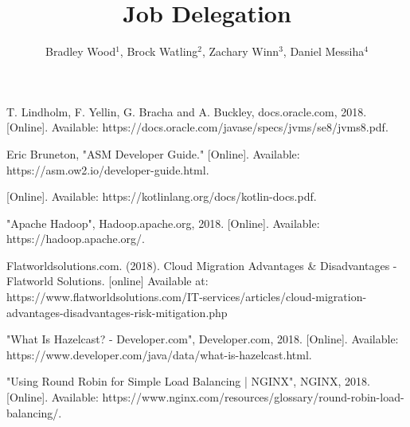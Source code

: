 \documentclass[letterpaper, 11 pt, conference]{ieeeconf}
\title{Job Delegation}
\author{Bradley Wood$^{1}$, Brock Watling$^{2}$, Zachary Winn$^{3}$, Daniel Messiha$^{4}$}
\begin{document}
    \maketitle
    \thispagestyle{empty}
    \pagestyle{empty}

    

    

    

    

    

    

    

    

    

    

    \addtolength{\textheight}{-12cm}


    \begin{thebibliography}{99}

        T. Lindholm, F. Yellin, G. Bracha and A. Buckley, docs.oracle.com, 2018. [Online].
        Available: https://docs.oracle.com/javase/specs/jvms/se8/jvms8.pdf.

        Eric Bruneton, "ASM Developer Guide." [Online].
        Available: https://asm.ow2.io/developer-guide.html.

        [Online].
        Available: https://kotlinlang.org/docs/kotlin-docs.pdf.

        "Apache Hadoop", Hadoop.apache.org, 2018. [Online].
        Available: https://hadoop.apache.org/.

        Flatworldsolutions.com. (2018).
        Cloud Migration Advantages & Disadvantages - Flatworld Solutions.
        [online] Available at: https://www.flatworldsolutions.com/IT-services/articles/cloud-migration-advantages-disadvantages-risk-mitigation.php

        "What Is Hazelcast? - Developer.com", Developer.com, 2018.
        [Online].
        Available: https://www.developer.com/java/data/what-is-hazelcast.html.

        "Using Round Robin for Simple Load Balancing | NGINX", NGINX, 2018. [Online]. Available: https://www.nginx.com/resources/glossary/round-robin-load-balancing/.

    \end{thebibliography}
\end{document}
